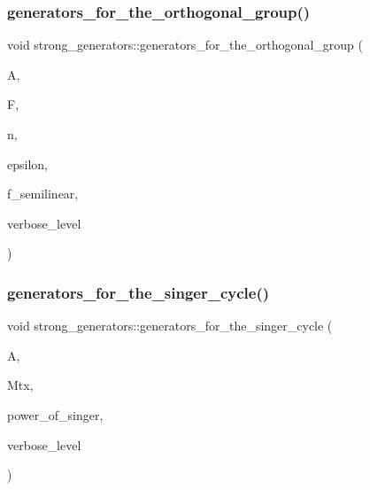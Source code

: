 \mbox{\label{classstrong__generators_a7c3cfb8607758df9116cf33336ef151d}} 
\subsubsection{\texorpdfstring{generators\+\_\+for\+\_\+the\+\_\+orthogonal\+\_\+group()}{generators\_for\_the\_orthogonal\_group()}}
{\footnotesize\ttfamily void strong\+\_\+generators\+::generators\+\_\+for\+\_\+the\+\_\+orthogonal\+\_\+group (\begin{DoxyParamCaption}\item[{\mbox{\hyperlink{classaction}{action}} $\ast$}]{A,  }\item[{\mbox{\hyperlink{classfinite__field}{finite\+\_\+field}} $\ast$}]{F,  }\item[{\mbox{\hyperlink{galois_8h_a09fddde158a3a20bd2dcadb609de11dc}{I\+NT}}}]{n,  }\item[{\mbox{\hyperlink{galois_8h_a09fddde158a3a20bd2dcadb609de11dc}{I\+NT}}}]{epsilon,  }\item[{\mbox{\hyperlink{galois_8h_a09fddde158a3a20bd2dcadb609de11dc}{I\+NT}}}]{f\+\_\+semilinear,  }\item[{\mbox{\hyperlink{galois_8h_a09fddde158a3a20bd2dcadb609de11dc}{I\+NT}}}]{verbose\+\_\+level }\end{DoxyParamCaption})}

\mbox{\label{classstrong__generators_a8b83b58ea8203e08a69ae6f7b4239db9}} 
\subsubsection{\texorpdfstring{generators\+\_\+for\+\_\+the\+\_\+singer\+\_\+cycle()}{generators\_for\_the\_singer\_cycle()}}
{\footnotesize\ttfamily void strong\+\_\+generators\+::generators\+\_\+for\+\_\+the\+\_\+singer\+\_\+cycle (\begin{DoxyParamCaption}\item[{\mbox{\hyperlink{classaction}{action}} $\ast$}]{A,  }\item[{\mbox{\hyperlink{classmatrix__group}{matrix\+\_\+group}} $\ast$}]{Mtx,  }\item[{\mbox{\hyperlink{galois_8h_a09fddde158a3a20bd2dcadb609de11dc}{I\+NT}}}]{power\+\_\+of\+\_\+singer,  }\item[{\mbox{\hyperlink{galois_8h_a09fddde158a3a20bd2dcadb609de11dc}{I\+NT}}}]{verbose\+\_\+level }\end{DoxyParamCaption})}

